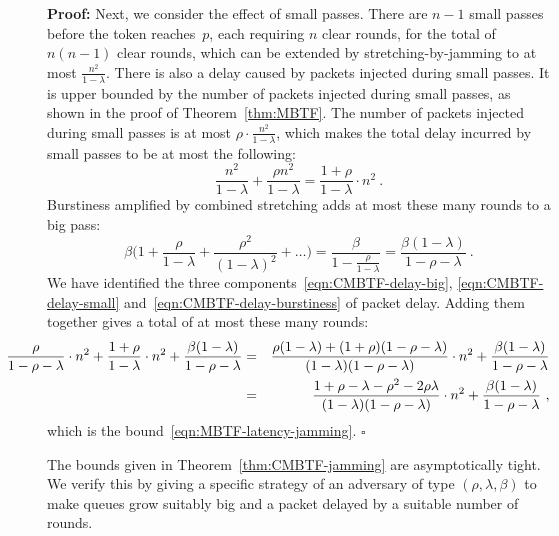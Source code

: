 \documentclass[11pt]{article}
\newcommand{\qed}{\hfill $\square$}
\newenvironment{proof}{\noindent\textbf{Proof: }}{\qed \smallbreak}
\begin{document}
\begin{proof}
Next, we consider the effect of small passes.
There are $n-1$  small passes before the token reaches~$p$, each requiring $n$ clear rounds, for the total of $n(n-1)$ clear rounds, which can be extended by stretching-by-jamming to at most $\frac{n^2}{1-\lambda}$.
There is also a delay caused by packets injected during small passes.
It is upper bounded by the number of packets injected during small passes, as shown in the proof of Theorem~\ref{thm:MBTF}.
The number of packets injected during small passes is at most $\rho\cdot \frac{n^2}{1-\lambda}$, which makes the total delay incurred by small passes to be at most the following:
\begin{equation}
\label{eqn:CMBTF-delay-small}
\frac{ n^2}{1-\lambda} +\frac{ \rho n^2}{1-\lambda}
= \frac{1+\rho }{1-\lambda} \cdot n^2
\ .
\end{equation}
Burstiness amplified by combined stretching adds at most these many rounds to a big pass:
\begin{equation}
\label{eqn:CMBTF-delay-burstiness}
\beta \bigl(1+\frac{\rho}{1-\lambda} + \frac{\rho^2}{(1-\lambda)^2} +\ldots\bigr)
=
\frac{\beta}{1-\frac{\rho}{1-\lambda}} = \frac{\beta(1-\lambda)}{1-\rho-\lambda}
\ .
\end{equation}
We have identified the three components~\eqref{eqn:CMBTF-delay-big}, \eqref{eqn:CMBTF-delay-small} and~\eqref{eqn:CMBTF-delay-burstiness} of packet delay.
Adding them together gives a total of at most these many rounds:
\begin{eqnarray}
\label{eqn:CMBTF-three-contributions}
\hspace*{-3em}
 \frac{\rho }{1-\rho-\lambda} \cdot n^2 
 +\frac{1+\rho}{1-\lambda}\cdot n^2 
 +\frac{\beta(1-\lambda)}{1-\rho-\lambda}
 &=&
 \frac{\rho(1-\lambda)+(1+\rho)(1-\rho-\lambda)}{(1-\lambda)(1-\rho-\lambda)} \cdot n^2
 +\frac{\beta(1-\lambda)}{1-\rho-\lambda}\\
 \nonumber
 &= &
  \frac{1+\rho-\lambda -\rho^2-2\rho\lambda}{(1-\lambda)(1-\rho-\lambda)} \cdot n^2
 +\frac{\beta(1-\lambda)}{1-\rho-\lambda}
 \ ,
\end{eqnarray}
which is the bound~\eqref{eqn:MBTF-latency-jamming}.
\end{proof}



The bounds given in Theorem~\ref{thm:CMBTF-jamming} are asymptotically tight.
We verify this by giving a specific strategy of an adversary of type $(\rho,\lambda,\beta)$ to make queues grow suitably big and a packet delayed by a suitable number of rounds. 
\end{document}
